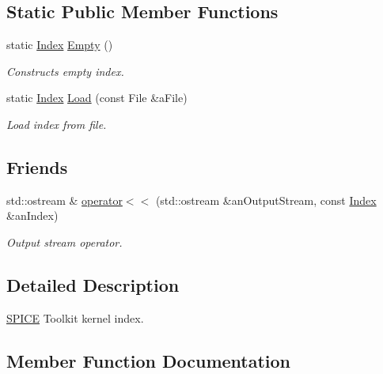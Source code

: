 \subsection*{Static Public Member Functions}
\begin{DoxyCompactItemize}
\item 
static \hyperlink{classlibrary_1_1physics_1_1env_1_1ephem_1_1spice_1_1_index}{Index} \hyperlink{classlibrary_1_1physics_1_1env_1_1ephem_1_1spice_1_1_index_a86b66f9884b8820ab592553005f18c51}{Empty} ()
\begin{DoxyCompactList}\small\item\em Constructs empty index. \end{DoxyCompactList}\item 
static \hyperlink{classlibrary_1_1physics_1_1env_1_1ephem_1_1spice_1_1_index}{Index} \hyperlink{classlibrary_1_1physics_1_1env_1_1ephem_1_1spice_1_1_index_af7a290a388b985c9dc621512085e400a}{Load} (const File \&a\+File)
\begin{DoxyCompactList}\small\item\em Load index from file. \end{DoxyCompactList}\end{DoxyCompactItemize}
\subsection*{Friends}
\begin{DoxyCompactItemize}
\item 
std\+::ostream \& \hyperlink{classlibrary_1_1physics_1_1env_1_1ephem_1_1spice_1_1_index_a1cdcc2b37f330da2f47a459f6225e98d}{operator$<$$<$} (std\+::ostream \&an\+Output\+Stream, const \hyperlink{classlibrary_1_1physics_1_1env_1_1ephem_1_1spice_1_1_index}{Index} \&an\+Index)
\begin{DoxyCompactList}\small\item\em Output stream operator. \end{DoxyCompactList}\end{DoxyCompactItemize}


\subsection{Detailed Description}
\hyperlink{classlibrary_1_1physics_1_1env_1_1ephem_1_1_s_p_i_c_e}{S\+P\+I\+CE} Toolkit kernel index. 

\subsection{Member Function Documentation}
\mbox{\label{classlibrary_1_1physics_1_1env_1_1ephem_1_1spice_1_1_index_a86b66f9884b8820ab592553005f18c51}} 
